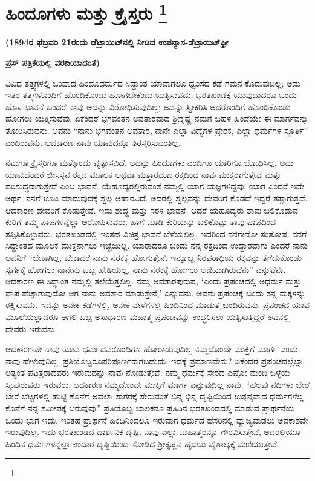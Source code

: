 
\chapter[ಹಿಂದೂಗಳು ಮತ್ತು ಕ್ರೈಸ್ತರು ]{ಹಿಂದೂಗಳು ಮತ್ತು ಕ್ರೈಸ್ತರು \protect\footnote{}}

\centerline{\textbf{(1894ರ ಫೆಬ್ರವರಿ 21ರಂದು ಡೆಟ್ರಾಯಿಟ್​ನಲ್ಲಿ ನೀಡಿದ ಉಪನ್ಯಾಸ-ಡೆಟ್ರಾಯಿಟ್​ ಫ್ರೀ}}

\centerline{\textbf{ ಪ್ರೆಸ್​ ಪತ್ರಿಕೆಯಲ್ಲಿ ವರದಿಯಾದಂತೆ)}}

\vskip 3pt

ವಿವಿಧ ತತ್ತ್ವಗಳಲ್ಲಿ ಒಂದಾದ ಹಿಂದೂಧರ್ಮದ ಸಿದ್ಧಾಂತ ಯಾವಾಗಲೂ ಧ್ವಂಸದ ಕಡೆ ಗಮನ ಕೊಡುವುದಿಲ್ಲ; ಅದು ಇತರ ತತ್ತ್ವಗಳೊಂದಿಗೆ ಹೊಂದಿಕೊಂಡು ಹೋಗಬೇಕೆಂದು ಯತ್ನಿಸುವದು. ಭರತಖಂಡಕ್ಕೆ ಯಾವುದಾದರೂ ಒಂದು ಹೊಸ ಭಾವನೆ ಬಂದರೆ ನಾವು ಅದನ್ನು ವಿರೋಧಿಸುವುದಿಲ್ಲ; ಅದನ್ನು ಸ್ವೀಕರಿಸಿ ಅದರೊಂದಿಗೆ ಹೊಂದಿಕೊಂಡು ಹೋಗಲು ಯತ್ನಿಸುವೆವು. ಏಕೆಂದರೆ ಭಗವಂತನ ಅವತಾರವಾದ ಶ‍್ರೀಕೃಷ್ಣ ನಮಗೆ ಬಹಳ ಹಿಂದೆಯೇ ಈ ಮಾರ್ಗವನ್ನು ತೋರಿಸಿರುವನು. ಅವನು “ನಾನು ಭಗವಂತನ ಅವತಾರ, ನಾನೇ ಎಲ್ಲಾ ವಿದ್ಯೆಗಳ ಪ್ರೇರಕ, ಎಲ್ಲಾ ಧರ್ಮಗಳ ಸ್ಫೂರ್ತಿ” ಎಂದಿರುವನು. ಆದಕಾರಣ ನಾವು ಯಾವುದನ್ನೂ ತಿರಸ್ಕರಿಸುವಂತಿಲ್ಲ.

\vskip 2pt

ನಮಗೂ ಕ್ರೈಸ್ತರಿಗೂ ಮತ್ತೊಂದು ವ್ಯತ್ಯಾಸವಿದೆ. ಅದನ್ನು ಹಿಂದೂಗಳು ಎಂದಿಗೂ ಯಾರಿಗೂ ಬೋಧಿಸಿಲ್ಲ. ಅದು ಯಾವುದೆಂದರೆ ಜೀಸಸ್ಸನ ರಕ್ತದ ಮೂಲಕ ಅಥವಾ ಮತ್ತಾರದೋ ರಕ್ತದಿಂದ ನಾವು ಮುಕ್ತರಾಗುತ್ತೇವೆ ಮತ್ತು ಪರಿಶುದ್ಧರಾಗುತ್ತೇವೆ ಎಂಬ ಭಾವನೆ. ಯೆಹೂದ್ಯರಲ್ಲಿರುವಂತೆ ನಮ್ಮಲ್ಲಿ ಯಾಗ ಯಜ್ಞಗಳಿದ್ದವು. ಯಾಗ ಎಂದರೆ ಇದೇ ಅರ್ಥ. ನನಗೆ ಊಟ ಮಾಡುವುದಕ್ಕೆ ಸ್ವಲ್ಪ ಆಹಾರವಿದೆ. ಅದರಲ್ಲಿ ಸ್ವಲ್ಪವನ್ನು ದೇವರಿಗೆ ಕೊಡದೆ ಇದ್ದರೆ ತಪ್ಪಾಗುತ್ತದೆ. ಆದಕಾರಣ ದೇವರಿಗೆ ಕೊಡುತ್ತೇವೆ. ಇದು ಶುದ್ಧ ಮತ್ತು ಸರಳ ಭಾವನೆ. ಆದರೆ ಯಹೂದ್ಯರು ತಾವು ಬಲಿಕೊಡುವ ಕುರಿಗೆ ತಮ್ಮ ಪಾಪಗಳನ್ನೆಲ್ಲಾ ಆರೋಪಿಸುವರು. ಹಾಗೆ ಮಾಡಿ ಕುರಿಯನ್ನು ಬಲಿಕೊಟ್ಟು ತಾವು ಪಾಪದಿಂದ ತಪ್ಪಿಸಿಕೊಳ್ಳುವರು. ಭರತಖಂಡದಲ್ಲಿ ಇಂತಹ ವಿಚಿತ್ರ ಭಾವನೆ ಬೆಳೆಯಲಿಲ್ಲ. ಇದರಿಂದ ನನಗೇನೋ ಸಂತೋಷ. ನನಗೆ ಸಿದ್ಧಾಂತದ ಮೂಲಕ ಮುಕ್ತನಾಗಲು ಇಚ್ಛೆಯಿಲ್ಲ. ಯಾರಾದರೂ ಬಂದು ನನ್ನ ರಕ್ತದಿಂದ ಉದ್ಧಾರವಾಗು ಎಂದರೆ ನಾನು ಅವನಿಗೆ “ಬೇಕಾಗಿಲ್ಲ, ಬೇಕಾದರೆ ನಾನು ನರಕಕ್ಕೆ ಹೋಗುತ್ತೇನೆ. ಇನ್ನೊಬ್ಬ ನಿರಪರಾಧಿಯ ರಕ್ತವನ್ನು ತೆಗೆದುಕೊಂಡು ಸ್ವರ್ಗಕ್ಕೆ ಹೋಗಲು ನಾನೇನು ಒಬ್ಬ ಹೇಡಿಯಲ್ಲ. ನಾನು ನರಕಕ್ಕೆ ಹೋಗಲು ಅಣಿಯಾಗಿರುವೆನು” ಎನ್ನುವೆನು. ಆದಕಾರಣ ಈ ಸಿದ್ಧಾಂತ ನಮ್ಮಲ್ಲಿ ತಲೆಯೆತ್ತಲಿಲ್ಲ. ನಮ್ಮ ಅವತಾರಪುರುಷ, ‘ಎಂದು ಪ್ರಪಂಚದಲ್ಲಿ ಅಧರ್ಮ ಮತ್ತು ಪಾಪ ಹೆಚ್ಚಾಗುವುದೋ ಆಗ ನಾನು ಅವತಾರ ಮಾಡುತ್ತೇನೆ,’ ಎನ್ನುವನು. ಅವನು ಪ್ರಪಂಚಕ್ಕೆ ಬಂದು ತನ್ನ ಮಕ್ಕಳನ್ನು ರಕ್ಷಿಸುವನು. ಇದನ್ನು ಅನೇಕ ಕಡೆಗಳಲ್ಲಿ, ಅನೇಕ ವೇಳೆಗಳಲ್ಲಿ ಹಿಂದಿನಿಂದ ಮಾಡುತ್ತ ಬಂದಿರುವನು. ಪ್ರಪಂಚದ ಯಾವ ಮೂಲೆಯಲ್ಲಾದರೂ ಆಗಲಿ ಒಬ್ಬ ಅಸಾಧಾರಣ ಮಹಾತ್ಮ ಪ್ರಪಂಚವನ್ನು ಉದ್ಧರಿಸಲು ಯತ್ನಿಸುತ್ತಿದ್ದರೆ ಅವನಲ್ಲಿ ದೇವರು ಇರುವನು.

ಆದಕಾರಣವೇ ನಾವು ಯಾವ ಧರ್ಮದವರೊಂದಿಗೂ ಹೋರಾಡುವುದಿಲ್ಲ.\break ನಮ್ಮದೊಂದೇ ಮುಕ್ತಿಗೆ ಮಾರ್ಗ ಎಂದು ನಾವು ಹೇಳುವುದಿಲ್ಲ. ಪ್ರತಿಯೊಬ್ಬರೂ\break ಪರಿಪೂರ್ಣರಾಗಬಹುದು. ಇದಕ್ಕೆ ಪ್ರಮಾಣವೇನು? ಏಕೆಂದರೆ ಪ್ರಪಂಚದಲ್ಲೆಲ್ಲಾ ಅತ್ಯಂತ ಪವಿತ್ರರಾದವರು ಇರುವುದನ್ನು ನಾವು ನೋಡುತ್ತೇವೆ. ನಮ್ಮ ಧರ್ಮಕ್ಕೆ ಸೇರದ ಎಷ್ಟೋ ಮಂದಿ ಒಳ್ಳೆಯ ಸ್ತ್ರೀಪುರುಷರು ಇರುವರು. ಆದಕಾರಣ ನಮ್ಮದೊಂದೇ ಮುಕ್ತಿಗೆ ಮಾರ್ಗ ಎನ್ನುವುದಿಲ್ಲ ನಾವು. “ಹಲವು ನದಿಗಳು ಬೇರೆ ಬೇರೆ ಬೆಟ್ಟಗಳಲ್ಲಿ ಹುಟ್ಟಿ ಕೊನೆಗೆ ಅವೆಲ್ಲಾ ಸಾಗರಕ್ಕೆ ಸೇರುವಂತೆ ಭಿನ್ನ ಭಿನ್ನ ದೃಷ್ಟಿಯಿಂದ ಉತ್ಪನ್ನವಾದ ಧರ್ಮಗಳೆಲ್ಲ ಕೊನೆಗೆ ನನ್ನ ಸಮೀಪಕ್ಕೆ ಬರುವುವು.” ಪ್ರತಿಯೊಬ್ಬ ಬಾಲಕನೂ ಪ್ರತಿದಿನ ಭರತಖಂಡದಲ್ಲಿ ಮಾಡುವ ಪ್ರಾರ್ಥನೆಯ ಒಂದು ಭಾಗ ಇದು. ಇಂತಹ ಪ್ರಾರ್ಥನೆ ಹಿಂದಿನಿಂದಲೂ ಇರುವಾಗ ಧರ್ಮದ ಹೆಸರಿನಲ್ಲಿ ವ್ಯಾಜ್ಯವಾಡಲು ಅವಕಾಶವೇ ಇರುವುದಿಲ್ಲ. ಇದು ಭರತಖಂಡದ ದಾರ್ಶನಿಕ ದೃಷ್ಟಿ. ನಾವು ಎಲ್ಲಾ ಮಹಾತ್ಮರನ್ನೂ ಗೌರವಿಸುತ್ತೇವೆ, ಅದರಲ್ಲಿಯೂ ಹಿಂದಿನ ಧರ್ಮಗಳನ್ನೆಲ್ಲಾ ಉದಾರ ದೃಷ್ಟಿಯಿಂದ ನೋಡಿದ ಶ‍್ರೀಕೃಷ್ಣನ ಹೃದಯ ವೈಶಾಲ್ಯಕ್ಕೆ ಮಣಿಯುತ್ತೇವೆ.


